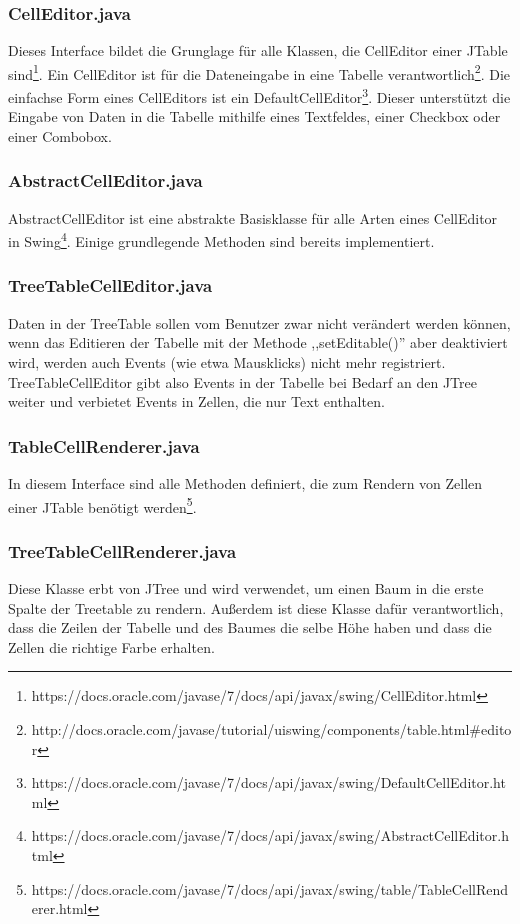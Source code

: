 \subsubsection*{CellEditor.java}
Dieses Interface bildet die Grunglage für alle Klassen, die CellEditor einer JTable sind\footnote{https://docs.oracle.com/javase/7/docs/api/javax/swing/CellEditor.html}.
\newline
Ein CellEditor ist für die Dateneingabe in eine Tabelle verantwortlich\footnote{http://docs.oracle.com/javase/tutorial/uiswing/components/table.html\#editor}. Die einfachse Form eines CellEditors ist ein DefaultCellEditor\footnote{https://docs.oracle.com/javase/7/docs/api/javax/swing/DefaultCellEditor.html}. Dieser unterstützt die Eingabe von Daten in die Tabelle mithilfe eines Textfeldes, einer Checkbox oder einer Combobox.

\subsubsection*{AbstractCellEditor.java}
AbstractCellEditor ist eine abstrakte Basisklasse für alle Arten eines CellEditor in Swing\footnote{https://docs.oracle.com/javase/7/docs/api/javax/swing/AbstractCellEditor.html}. Einige grundlegende Methoden sind bereits implementiert.

\subsubsection*{TreeTableCellEditor.java}
Daten in der TreeTable sollen vom Benutzer zwar nicht verändert werden können, wenn das Editieren der Tabelle mit der Methode ,,setEditable()'' aber deaktiviert wird, werden auch Events (wie etwa Mausklicks) nicht mehr registriert. TreeTableCellEditor gibt also Events in der Tabelle bei Bedarf an den JTree weiter und verbietet Events in Zellen, die nur Text enthalten.

\subsubsection*{TableCellRenderer.java}
In diesem Interface sind alle Methoden definiert, die zum Rendern von Zellen einer JTable benötigt werden\footnote{https://docs.oracle.com/javase/7/docs/api/javax/swing/table/TableCellRenderer.html}.

\subsubsection*{TreeTableCellRenderer.java}
Diese Klasse erbt von JTree und wird verwendet, um einen Baum in die erste Spalte der Treetable zu rendern. Außerdem ist diese Klasse dafür verantwortlich, dass die Zeilen der Tabelle und des Baumes die selbe Höhe haben und dass die Zellen die richtige Farbe erhalten.

